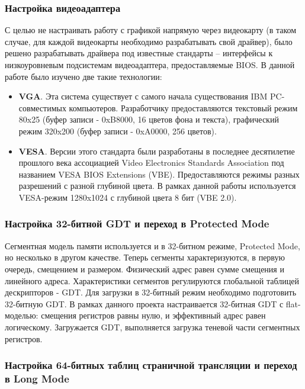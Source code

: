 \documentclass[a4paper,11pt]{extarticle}
\begin{document}
	\subsubsection{Настройка видеоадаптера} \label{ssb:video}
	С целью не настраивать работу с графикой напрямую через видеокарту (в таком случае, для каждой видеокарты необходимо разрабатывать свой драйвер), было решено разрабатывать драйвера под известные стандарты -- интерфейсы к низкоуровневым подсистемам видеоадаптера, предоставляемые BIOS. В данной работе было изучено две такие технологии:
	\begin{itemize}
		\item \textbf{VGA}. Эта система существует с самого начала существования IBM PC-совместимых компьютеров. Разработчику предоставляются текстовый режим 80x25 (буфер записи - 0xB8000, 16 цветов фона и текста), графический режим 320x200 (буфер записи - 0xA0000, 256 цветов).
		\item \textbf{VESA}. Версии этого стандарта были разработаны в последнее десятилетие прошлого века ассоциацией Video Electronics Standards Association под названием VESA BIOS Extensions (VBE). Предоставляются режимы разных разрешений с разной глубиной цвета. В рамках данной работы используется VESA-режим 1280x1024 с глубиной цвета 8 бит (VBE 2.0).
	\end{itemize}
	\subsubsection{Настройка 32-битной GDT и переход в Protected Mode}  \label{ssb:pm}
	Сегментная модель памяти используется и в 32-битном режиме, Protected Mode, но несколько в другом качестве. Теперь сегменты характеризуются, в первую очередь, смещением и размером. Физический адрес равен сумме смещения и линейного адреса. Характеристики сегментов регулируются глобальной таблицей дескрипторов - GDT. Для загрузки в 32-битный режим необходимо подготовить 32-битную GDT. В рамках данного проекта настраивается 32-битная GDT с flat-моделью: смещения регистров равны нулю, и эффективный адрес равен логическому. Загружается GDT, выполняется загрузка теневой части сегментных регистров.
	
	\subsubsection{Настройка 64-битных таблиц страничной трансляции и переход в Long Mode}
	
\end{document}
